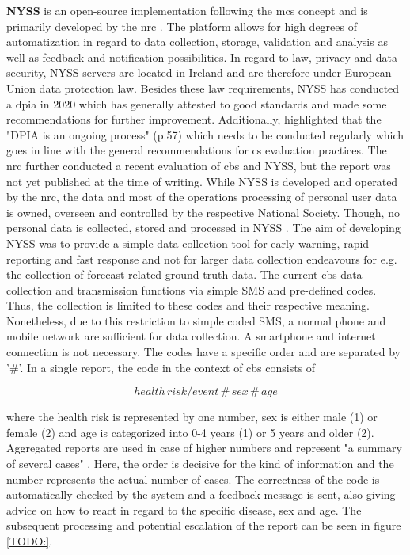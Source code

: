\textbf{NYSS} is an open-source implementation following the \acrshort{mcs} concept and is primarily developed by the \acrshort{nrc} \autocite{nrcNyssToolDeveloped2022}. The platform allows for high degrees of automatization in regard to data collection, storage, validation and analysis as well as feedback and notification possibilities.\newline
In regard to law, privacy and data security, NYSS servers are located in Ireland and are therefore under European Union data protection law. Besides these law requirements, NYSS has conducted a \acrfull{dpia} in 2020 \autocite{quinnNyssDATAPROTECTION2020} which has generally attested to good standards and made some recommendations for further improvement. Additionally, \autocite{quinnNyssDATAPROTECTION2020} highlighted that the "DPIA is an ongoing process" (p.57) which needs to be conducted regularly which goes in line with the general recommendations for \acrshort{cs} evaluation practices. The \acrshort{nrc} further conducted a recent evaluation of \acrshort{cbs} and NYSS, but the report was not yet published at the time of writing.\newline
While NYSS is developed and operated by the \acrshort{nrc}, the data and most of the operations processing of personal user data is owned, overseen and controlled by the respective National Society. Though, no personal data is collected, stored and processed in NYSS \autocite{nrcNYSSCommunitybasedSurveillance2021}.\newline
The aim of developing NYSS was to provide a simple data collection tool for early warning, rapid reporting and fast response and not for larger data collection endeavours for e.g. the collection of forecast related ground truth data. The current \acrshort{cbs} data collection and transmission functions via simple SMS and pre-defined codes. Thus, the collection is limited to these codes and their respective meaning. Nonetheless, due to this restriction to simple coded SMS, a normal phone and mobile network are sufficient for data collection. A smartphone and internet connection is not necessary. The codes have a specific order and are separated by '#'. In a single report, the code in the context of \acrshort{cbs} consists of 

    \[health\, risk/event\, \#\, sex\, \#\, age\] %

where the health risk is represented by one number, sex is either male (1) or female (2) and age is categorized into 0-4 years (1) or 5 years and older (2). Aggregated reports are used in case of higher numbers and represent "a summary of several cases" \autocite[35]{nrcNYSSCommunitybasedSurveillance2021}. Here, the order is decisive for the kind of information and the number represents the actual number of cases. The correctness of the code is automatically checked by the system and a feedback message is sent, also giving advice on how to react in regard to the specific disease, sex and age. The subsequent processing and potential escalation of the report can be seen in figure \ref{TODO:}.

